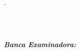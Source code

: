 %
% 
%
\begin{folhadeaprovacao}
\vfill

\begin{center}
{\large \textbf{\MakeUppercase{\imprimirinstituicao}}}\\
{\large \textbf{\MakeUppercase{\programaLinhaUm}}}\\
{\large \textbf{\MakeUppercase{\programaLinhaDois}}}\\[3cm]
{\Huge \imprimirtitulo.}\\[3cm]
{\large \textbf{\imprimirautor}} \\[1cm]

\end{center}
\vfill
\begin{flushright}
\begin{minipage}{11cm}
{
	\aprovacao
}\\[1cm]
\end{minipage}
\end{flushright}

	\begin{flushright}
	\begin{minipage}{11cm}
		\textit{\large \textbf{Banca Examinadora:\\}}
			{\large \bancaexaminadora}
	\end{minipage}
	\end{flushright}
\begin{center}
	\large \textbf{\imprimirlocal}\\
	\large \textbf{\anodeaprovacao}
\end{center}
\end{folhadeaprovacao}
\newpage